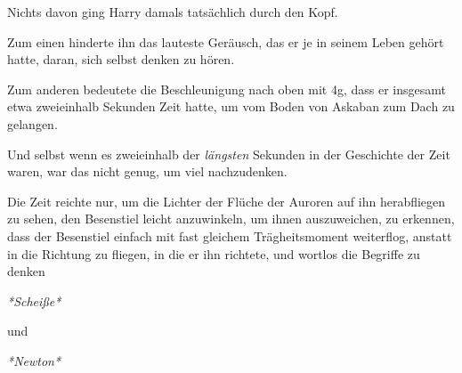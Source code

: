 Nichts davon ging Harry damals tatsächlich durch den Kopf.

Zum einen hinderte ihn das lauteste Geräusch, das er je in seinem Leben gehört hatte, daran, sich selbst denken zu hören.

Zum anderen bedeutete die Beschleunigung nach oben mit 4g, dass er insgesamt etwa zweieinhalb Sekunden Zeit hatte, um vom Boden von Askaban zum Dach zu gelangen.

Und selbst wenn es zweieinhalb der \emph{längsten} Sekunden in der Geschichte der Zeit waren, war das nicht genug, um viel nachzudenken.

Die Zeit reichte nur, um die Lichter der Flüche der Auroren auf ihn herabfliegen zu sehen, den Besenstiel leicht anzuwinkeln, um ihnen auszuweichen, zu erkennen, dass der Besenstiel einfach mit fast gleichem Trägheitsmoment weiterflog, anstatt in die Richtung zu fliegen, in die er ihn richtete, und wortlos die Begriffe zu denken

\emph{*Scheiße*}

und

\emph{*Newton*}

